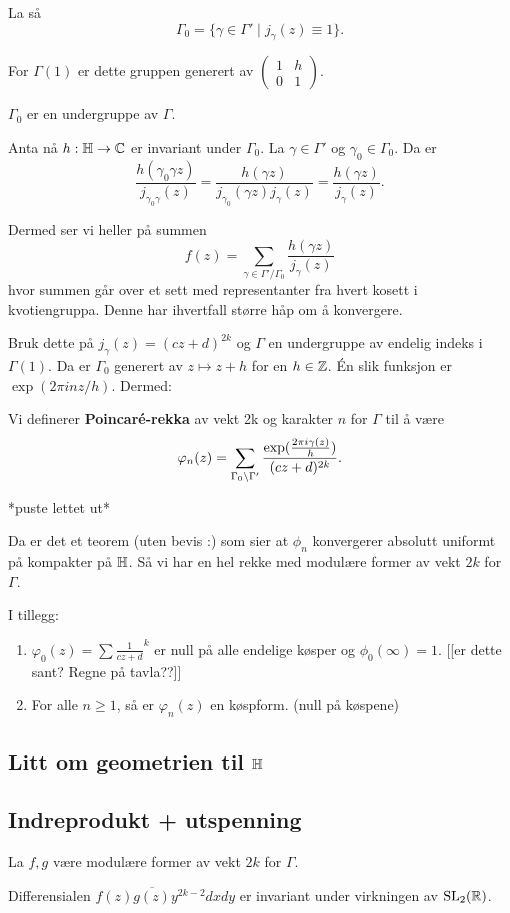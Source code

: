 \message{ !name(seminar30april15.tex)}\documentclass[11pt, english]{article}
\begin{document}
La så 
\[
\Gamma_0 = \{ \gamma \in \Gamma' \mid j_\gamma(z) \equiv 1 \}. 
\]

For $\Gamma(1)$ er dette gruppen generert av $\begin{pmatrix} 1 & h \\ 0 & 1 \end{pmatrix}$.

$\Gamma_0$ er en undergruppe av $\Gamma$.

Anta nå $h:\mathbb{H} \to \mathbb{C}$ er invariant under $\Gamma_0$. La $\gamma \in \Gamma'$ og $\gamma_0 \in \Gamma_0$. Da er 
\[
\frac{h(\gamma_0 \gamma z)}{j_{\gamma_0 \gamma}(z)} = \frac{h(\gamma z)}{j_{\gamma_0}(\gamma z) j_\gamma(z)} = \frac{h(\gamma z)}{j_\gamma(z)}.
\]

Dermed ser vi heller på summen
\[
f(z) = \sum_{\gamma \in \Gamma'/\Gamma_0} \frac{h(\gamma z)}{j_\gamma(z)}
\]
hvor summen går over et sett med representanter fra hvert kosett i kvotiengruppa. Denne har ihvertfall større håp om å konvergere.


Bruk dette på $j_\gamma(z) = (cz+d)^{2k}$ og $\Gamma$ en undergruppe av endelig indeks i $\Gamma(1)$. Da er $\Gamma_0$ generert av $z \mapsto z+h$ for en $ h \in \mathbb{Z}$. Én slik funksjon er $\exp(2 \pi i nz/h)$. Dermed:

\begin{defi}
Vi definerer \textbf{Poincaré-rekka} av vekt 2k og karakter $n$ for $\Gamma$ til å være 
\[
\varphi_n(z) = \sum_{\Gamma_0 \backslash \Gamma'} \frac{\exp(\frac{2 \pi i \gamma (z)}{h})}{(cz+d)^{2k}}.
\]
\end{defi}
*puste lettet ut*

Da er det et teorem (uten bevis :) som sier at $\phi_n$ konvergerer absolutt uniformt på kompakter på $\mathbb{H}$. Så vi har en hel rekke med modulære former av vekt $2k$ for $\Gamma$. 

I tillegg:

\begin{enumerate}
\item $\varphi_0(z) = \sum \frac{1}{cz+d}^k$ er null på alle endelige køsper og $\phi_0(\infty)=1$. [[er dette sant? Regne på tavla??]]
\item For alle $n \geq 1$, så er $\varphi_n(z)$ en køspform. (null på køspene)
\end{enumerate}

\subsection{Litt om geometrien til $\mathbb{H}$ }


\subsection{Indreprodukt + utspenning}

La $f,g$ være modulære former av vekt $2k$ for $\Gamma$.

\begin{lemma}
  Differensialen $f(z) \overline{g(z)} y^{2k-2} dx dy$ er invariant under virkningen av $\operatorname{SL}_2(\mathbb{R})$. 
\end{lemma}

\end{document}
